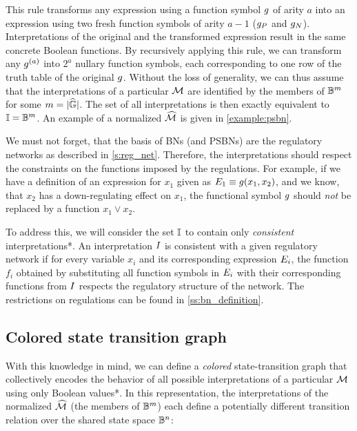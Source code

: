 This rule transforms any expression using a function symbol $g$ of arity $a$ into an expression using two fresh function symbols of arity $a-1$ ($g_P$ and $g_N$). Interpretations of the original and the transformed expression result in the same concrete Boolean functions. By recursively applying this rule, we can transform any $g^{(a)}$ into $2^a$ nullary function symbols, each corresponding to one row of the truth table of the original $g$. Without the loss of generality, we can thus assume that the interpretations of a particular $\mathcal{M}$ are identified by the members of $\mathbb{B}^{m}$ for some $m = |\widehat{\mathbb{G}}|$. The set of all interpretations is then exactly equivalent to  $\mathbb{I} = \mathbb{B}^m$. An example of a normalized $\widehat{\mathcal{M}}$ is given in \autoref{example:psbn}.

We must not forget, that the basis of BNs (and PSBNs) are the regulatory networks as described in \autoref{s:reg_net}. Therefore, the interpretations should respect the constraints on the functions imposed by the regulations. For example, if we have a definition of an expression for $x_1$ given as $E_1 \equiv g(x_1, x_2)$, and we know, that $x_2$ has a down-regulating effect on $x_1$, the functional symbol $g$ should \emph{not} be replaced by a function $x_1 \lor x_2$.

To address this, we will consider the set $\mathbb{I}$ to contain only \emph{consistent} interpretations*.
 An interpretation $I$ is consistent with a given regulatory network if for every variable $x_i$ and its corresponding expression $E_i$, the function $f_i$ obtained by substituting all function symbols in $E_i$ with their corresponding functions from $I$ respects the regulatory structure of the network. The restrictions on regulations can be found in \autoref{ss:bn_definition}. 

\subsection{Colored state transition graph}
\label{ss:psbn_stg}

With this knowledge in mind, we can define a \emph{colored} state-transition graph that collectively encodes the behavior of all possible interpretations of a particular $\mathcal{M}$ using only Boolean values*. In this representation, the interpretations of the normalized $\widehat{\mathcal{M}}$ (the members of $\mathbb{B}^m$) each define a potentially different transition relation over the shared state space $\mathbb{B}^n$:

